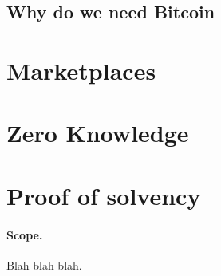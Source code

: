 \subsection{Why do we need Bitcoin}


\section{Marketplaces}

\section{Zero Knowledge}

\section{Proof of solvency}


 

\paragraph{Scope.} 
Blah blah blah.




